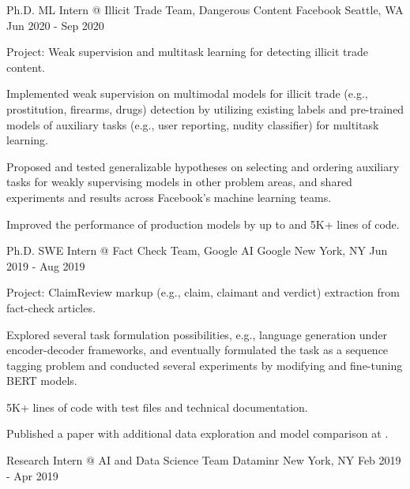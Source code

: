 \documentclass[letterpaper]{awesome-cv}
\begin{document}
\addvspace{1ex}
\begin{cventries}
  \cventry
    {Ph.D. ML Intern @ Illicit Trade Team, Dangerous Content}
    {Facebook}
    {Seattle, WA}
    {Jun 2020 - Sep 2020}
    {
      \begin{cvitems}
        \item {Project: Weak supervision and multitask learning for detecting illicit trade content.}
        \item {Implemented weak supervision on multimodal models for illicit trade (e.g., prostitution, firearms, drugs) detection by utilizing existing labels and pre-trained models of auxiliary tasks (e.g., user reporting, nudity classifier) for multitask learning.}
        \item {Proposed and tested generalizable hypotheses on selecting and ordering auxiliary tasks for weakly supervising models in other problem areas, and shared experiments and results across Facebook's machine learning teams.}
        \item {Improved the performance of production models by up to  and  5K+ lines of code.}
      \end{cvitems}
    }
  \cventry
    {Ph.D. SWE Intern @ Fact Check Team, Google AI}
    {Google}
    {New York, NY}
    {Jun 2019 - Aug 2019}
    {
      \begin{cvitems}
        \item {Project: ClaimReview markup (e.g., claim, claimant and verdict) extraction from fact-check articles.}
        \item {Explored several task formulation possibilities, e.g., language generation under encoder-decoder frameworks, and eventually formulated the task as a sequence tagging problem and conducted several experiments by modifying and fine-tuning BERT models.}
        \item { 5K+ lines of code with test files and technical documentation.}
        \item {Published a paper with additional data exploration and model comparison at .}
      \end{cvitems}
    }
  \cventry
    {Research Intern @ AI and Data Science Team}
    {Dataminr}
    {New York, NY}
    {Feb 2019 - Apr 2019}
    {
      \begin{cvitems}

\end{cvitems}}
\end{cventries}
\end{document}
